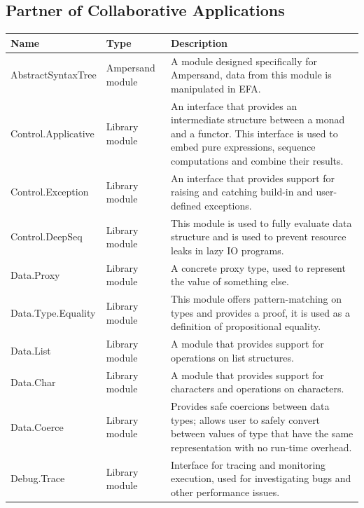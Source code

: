 \documentclass[12pt]{report}
\begin{document}
\subsection{Partner of Collaborative Applications}
\begin{longtable}{ |m{4.5cm}|m{1.5cm}|m{7cm}|  }
    \hline 
    \textbf{Name} & \textbf{Type} & \textbf{Description} \\ \hline \hline
    AbstractSyntaxTree & Ampersand module & A module designed specifically for 
    Ampersand, data from this module is manipulated in EFA.
    \\ \hline        
    Control.Applicative & Library module & An interface that provides an 
    intermediate structure between a monad and a functor. This interface is 
    used to embed pure expressions, sequence computations and combine their 
    results.  \\ \hline
    Control.Exception & Library module & An interface that provides support for 
    raising and catching build-in and user-defined exceptions.  \\ \hline
    Control.DeepSeq & Library module & This module is used to fully evaluate 
    data structure and is used to prevent resource leaks in lazy IO programs.  
    \\ \hline            
    Data.Proxy & Library module & A concrete proxy type, used to represent the 
    value of something else.  \\ \hline    
    Data.Type.Equality & Library module & This module offers pattern-matching 
    on types and provides a proof, it is used as a definition of propositional 
    equality.  \\ \hline        
    Data.List & Library module & A module that provides support for operations 
    on list structures.  \\ \hline
    Data.Char & Library module & A module that provides support for characters 
    and operations on characters.  \\ \hline
    Data.Coerce & Library module & Provides safe coercions between data types; 
    allows user to safely convert between values of type that have the same 
    representation with no run-time overhead.   \\ \hline
    Debug.Trace & Library module & Interface for tracing and monitoring 
    execution, used for investigating bugs and other performance issues.  \\ 

\end{longtable}
\end{document}
